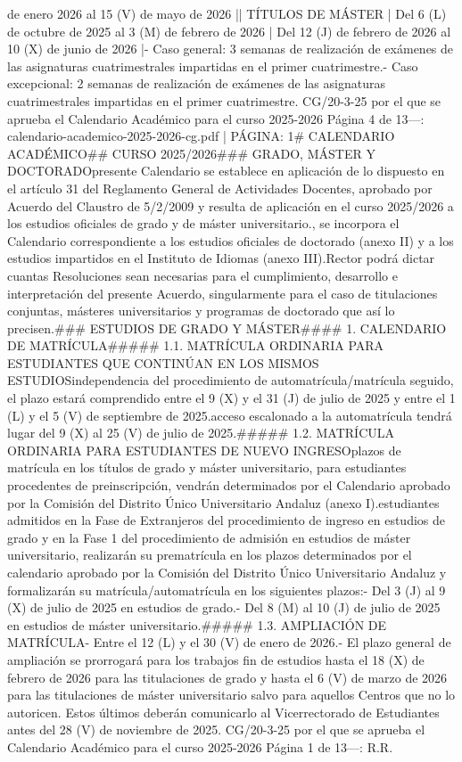 \documentclass{article}
\begin{document}
\begin{itemize}
{de enero 2026 al 15 (V) de mayo de 2026 |\n| TÍTULOS DE MÁSTER | Del 6 (L) de octubre de 2025 al 3 (M) de febrero de 2026 | Del 12 (J) de febrero de 2026 al 10 (X) de junio de 2026 |\n\n- Caso general: 3 semanas de realización de exámenes de las asignaturas cuatrimestrales impartidas en el primer cuatrimestre.\n- Caso excepcional: 2 semanas de realización de exámenes de las asignaturas cuatrimestrales impartidas en el primer cuatrimestre.\n{} CG/20-3-25 por el que se aprueba el Calendario Académico para el curso 2025-2026  Página 4 de 13\n\n---\n\nFUENTE: calendario-academico-2025-2026-cg.pdf | PÁGINA: 1\n# CALENDARIO ACADÉMICO\n## CURSO 2025/2026\n\n### GRADO, MÁSTER Y DOCTORADO\n\nEl presente Calendario se establece en aplicación de lo dispuesto en el artículo 31 del Reglamento General de Actividades Docentes, aprobado por Acuerdo del Claustro de 5/2/2009 y resulta de aplicación en el curso 2025/2026 a los estudios oficiales de grado y de máster universitario.\n\nAsimismo, se incorpora el Calendario correspondiente a los estudios oficiales de doctorado (anexo II) y a los estudios impartidos en el Instituto de Idiomas (anexo III).\n\nEl Rector podrá dictar cuantas Resoluciones sean necesarias para el cumplimiento, desarrollo e interpretación del presente Acuerdo, singularmente para el caso de titulaciones conjuntas, másteres universitarios y programas de doctorado que así lo precisen.\n\n### ESTUDIOS DE GRADO Y MÁSTER\n\n#### 1. CALENDARIO DE MATRÍCULA\n\n##### 1.1. MATRÍCULA ORDINARIA PARA ESTUDIANTES QUE CONTINÚAN EN LOS MISMOS ESTUDIOS\n\nCon independencia del procedimiento de automatrícula/matrícula seguido, el plazo estará comprendido entre el 9 (X) y el 31 (J) de julio de 2025 y entre el 1 (L) y el 5 (V) de septiembre de 2025.\n\nEl acceso escalonado a la automatrícula tendrá lugar del 9 (X) al 25 (V) de julio de 2025.\n\n##### 1.2. MATRÍCULA ORDINARIA PARA ESTUDIANTES DE NUEVO INGRESO\n\nLos plazos de matrícula en los títulos de grado y máster universitario, para estudiantes procedentes de preinscripción, vendrán determinados por el Calendario aprobado por la Comisión del Distrito Único Universitario Andaluz (anexo I).\n\nLos estudiantes admitidos en la Fase de Extranjeros del procedimiento de ingreso en estudios de grado y en la Fase 1 del procedimiento de admisión en estudios de máster universitario, realizarán su prematrícula en los plazos determinados por el calendario aprobado por la Comisión del Distrito Único Universitario Andaluz y formalizarán su matrícula/automatrícula en los siguientes plazos:\n\n- Del 3 (J) al 9 (X) de julio de 2025 en estudios de grado.\n- Del 8 (M) al 10 (J) de julio de 2025 en estudios de máster universitario.\n\n##### 1.3. AMPLIACIÓN DE MATRÍCULA\n\n- Entre el 12 (L) y el 30 (V) de enero de 2026.\n- El plazo general de ampliación se prorrogará para los trabajos fin de estudios hasta el 18 (X) de febrero de 2026 para las titulaciones de grado y hasta el 6 (V) de marzo de 2026 para las titulaciones de máster universitario salvo para aquellos Centros que no lo autoricen. Estos últimos deberán comunicarlo al Vicerrectorado de Estudiantes antes del 28 (V) de noviembre de 2025.\n{} CG/20-3-25 por el que se aprueba el Calendario Académico para el curso 2025-2026  Página 1 de 13\n\n---\n\nFUENTE: R.R. }
\end{itemize}
\end{document}
